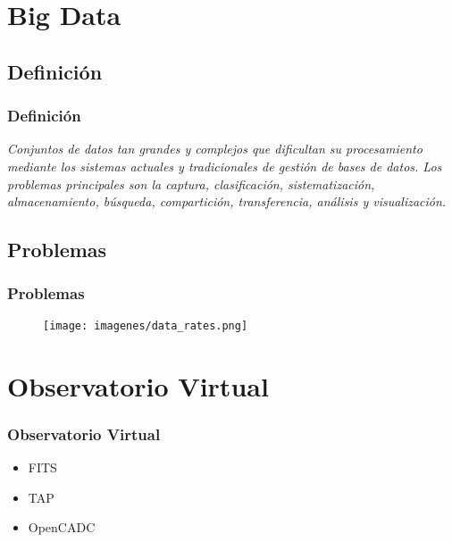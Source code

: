 \documentclass[serif,12pt]{beamer}
\begin{document}
\section{Big Data}

\subsection{Definición}
\begin{frame}
\frametitle{Definición}

\begin{shaded}
\emph{Conjuntos de datos tan grandes y complejos que dificultan su procesamiento mediante los sistemas actuales y tradicionales de gestión de bases de datos. Los problemas principales son la captura, clasificación, sistematización, almacenamiento, búsqueda, compartición, transferencia, análisis y visualización.}
\end{shaded}
\end{frame}
\subsection{Problemas}

\begin{frame}
\frametitle{Problemas}

\begin{figure}
\centering
\texttt{[image: imagenes/data\_rates.png]} 
\label{fig:data_rates}
\end{figure}


\end{frame}

\section{Observatorio Virtual}
\begin{frame}
\frametitle{Observatorio Virtual}

\begin{itemize}
\item FITS
\item TAP
\item OpenCADC
\end{itemize}

\end{frame}
\end{document}
